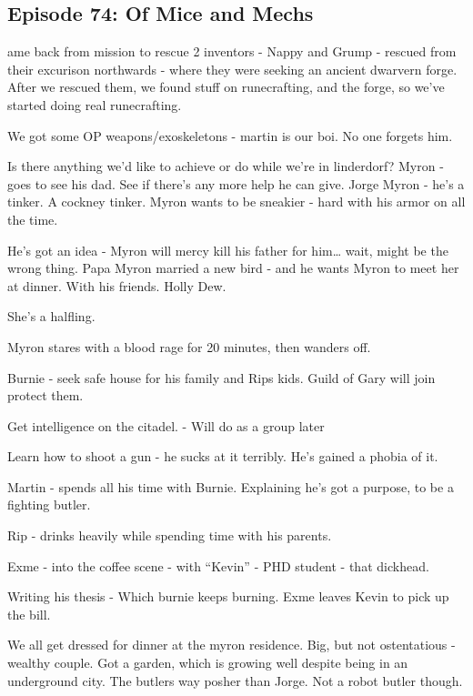 \subsection{Episode 74: Of Mice and Mechs}

ame back from mission to rescue 2 inventors - Nappy and Grump - rescued from their excurison northwards - where they were seeking an ancient dwarvern forge. After we rescued them, we found stuff on runecrafting, and the forge, so we’ve started doing real runecrafting.\medskip

We got some OP weapons/exoskeletons - martin is our boi. No one forgets him.\medskip

Is there anything we’d like to achieve or do while we’re in linderdorf? Myron - goes to see his dad. See if there’s any more help he can give. Jorge Myron - he’s a tinker. A cockney tinker. Myron wants to be sneakier - hard with his armor on all the time.\medskip

He’s got an idea - Myron will mercy kill his father for him… wait, might be the wrong thing. Papa Myron married a new bird - and he wants Myron to meet her at dinner. With his friends. Holly Dew.\medskip

She’s a halfling.\medskip

Myron stares with a blood rage for 20 minutes, then wanders off.\medskip

Burnie - seek safe house for his family and Rips kids. Guild of Gary will join protect them.\medskip

Get intelligence on the citadel. - Will do as a group later\medskip

Learn how to shoot a gun - he sucks at it terribly. He’s gained a phobia of it.\medskip

Martin - spends all his time with Burnie. Explaining he’s got a purpose, to be a fighting butler.\medskip

Rip - drinks heavily while spending time with his parents.\medskip

Exme - into the coffee scene - with “Kevin” - PHD student - that dickhead.\medskip

Writing his thesis - Which burnie keeps burning. Exme leaves Kevin to pick up the bill.\medskip

We all get dressed for dinner at the myron residence. Big, but not ostentatious - wealthy couple. Got a garden, which is growing well despite being in an underground city. The butlers way posher than Jorge. Not a robot butler though.\medskip

